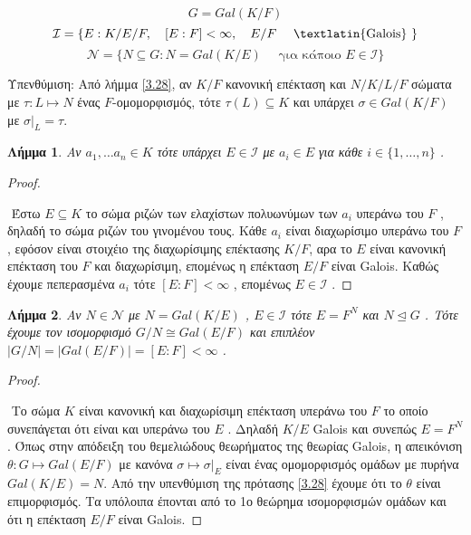 \documentclass[oneside,a4paper]{article}
\newtheorem{lemma}{Λήμμα}
\newcommand {\tl}{\textlatin}
\begin{document}
$$G=Gal(K/F)$$
$$\mathcal{I} = \{ E: K/E/F , \quad [E:F]<\infty , \quad E/F \quad\text{ \tl{Galois} } \}$$
$$\mathcal{N} = \{N \subseteq G: N = Gal(K/E) \quad\text{ για κάποιo } E \in \mathcal{I} \}$$

Υπενθύμιση: Από λήμμα \ref{3.28}, αν $K/F$ κανονική επέκταση και $N/K/L/F$ σώματα με $\tau :L \mapsto N$ ένας $F$-ομομορφισμός, τότε $\tau(L) \subseteq K$ και υπάρχει $\sigma \in Gal(K/F)$ με $\sigma|_L = \tau$.


\begin{lemma} \label{17.1} Aν $a_1 , \ldots a_n \in K$ τότε υπάρχει $E \in \mathcal{I}$ με $a_i \in E$ για κάθε $i \in \{1,\dots, n\}$ .
\end{lemma}
\begin{proof} $ $%


$ $\newline
Έστω $E\subseteq K$ το σώμα ριζών των ελαχίστων πολυωνύμων των $a_i$ υπεράνω του $F$ , δηλαδή το σώμα ριζών του γινομένου τους. Kάθε $a_i$ είναι διαχωρίσιμο υπεράνω του $F$, εφόσον είναι στοιχέιο της διαχωρίσιμης επέκτασης $K/F$, αρα το $E$ είναι κανονική επέκταση του $F$ και διαχωρίσιμη, επομένως η επέκταση $E/F$ είναι \tl{Galois}. Καθώς έχουμε πεπερασμένα $a_i$ τότε $[E:F]< \infty$ , επομένως $E \in \mathcal{I}$ .

\end{proof}

\begin{lemma} \label{17.2} Αν $N \in \mathcal{N}$ με $N = Gal(K/E)$ , $E \in \mathcal{I}$ τότε $E=F^N$ και $N\unlhd G$ . Τότε έχουμε τον ισομορφισμό $G/N \cong Gal(E/F)$ και επιπλέον $|G/N| = |Gal(E/F)| = [E:F] < \infty$ .
\end{lemma}  
\begin{proof} $ $
 
$ $\newline
Το σώμα $K$ είναι κανονική και διαχωρίσιμη επέκταση υπεράνω του $F$ το οποίο συνεπάγεται ότι είναι και υπεράνω του $E$ . Δηλαδή $K/E$ \tl{Galois} και συνεπώς $E = F^N$. Όπως στην απόδειξη του θεμελιώδους θεωρήματος της θεωρίας \tl{Galois}, η απεικόνιση $\theta : G \mapsto Gal(E/F)$ με κανόνα $\sigma \mapsto \sigma|_E$ είναι ένας ομομορφισμός ομάδων με πυρήνα $Gal(K/E) = N$. Από την υπενθύμιση της πρότασης \ref{3.28} έχουμε ότι το $\theta$ είναι επιμορφισμός. Τα υπόλοιπα έπονται από το 1ο θεώρημα ισομορφισμών ομάδων και ότι η επέκταση $E/F$ είναι \tl{Galois}.
\end{proof}
\end{document}
